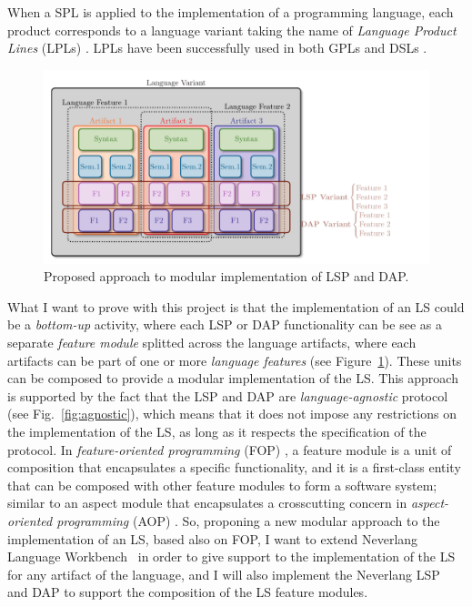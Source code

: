 When a SPL is applied to the implementation of a programming language, each product corresponds to a language variant \cite{Cazzola15f} taking the name of \textit{Language Product Lines} (LPLs) \cite{Cazzola15f}. LPLs have been successfully used in both GPLs \cite{Cazzola16, Cazzola16i, Cazzola15f} and DSLs \cite{Haugen08, Liebig13, Cazzola14e, Wende09, White09}.
\hfill \break
\begin{figure}[t]
    \centering
    \includegraphics[width=1\linewidth]{figs/module_with_lsp.pdf}
    \caption{Proposed approach to modular implementation of LSP and DAP.}
    \label{fig:proposed}
\end{figure}
What I want to prove with this project is that the implementation of an LS could be a \textit{bottom-up} activity, where each LSP or DAP functionality can be see as a separate \textit{feature module} \cite{Batory04, Kastner11} splitted across the language artifacts, where each artifacts can be part of one or more \textit{language features} (see Figure~\ref{fig:proposed}). These units can be composed to provide a modular implementation of the LS. This approach is supported by the fact that the LSP and DAP are \textit{language-agnostic} protocol \cite{Niephaus20, Rodriguez-Echeverria18} (see Fig.~\ref{fig:agnostic}), which means that it does not impose any restrictions on the implementation of the LS, as long as it respects the specification of the protocol.
In \textit{feature-oriented programming} (FOP) \cite{Apel13, Czarnecki04, Prehofer01}, a feature module is a unit of composition that encapsulates a specific functionality, and it is a first-class entity that can be composed with other feature modules to form a software system; similar to an aspect module that encapsulates a crosscutting concern in \textit{aspect-oriented programming} (AOP) \cite{Kiczales01, Kiczales97, Laddad03}.
So, proponing a new modular approach to the implementation of an LS, based also on FOP, I want to extend Neverlang Language Workbench~\cite{Cazzola15c, Cazzola14c} in order to give support to the implementation of the LS for any artifact of the language, and I will also implement the Neverlang LSP~\cite{Cazzola19} and DAP to support the composition of the LS feature modules.
